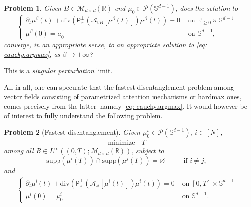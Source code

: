\documentclass[a4paper,11pt]{article}
\theoremstyle{plain}
\newtheorem{problem}{Problem}
\newcommand{\supp}{\mathrm{supp}}
\newcommand{\R}{\mathbb{R}}
\newcommand{\proj}{\bm{\mathsf{P}}^\perp}
\newcommand{\dive}{\mathrm{div}}
\renewcommand{\S}{\mathbb{S}^{d-1}}
\newcommand{\bB}{\bm{\mathit{B}}}
\renewcommand{\geq}{\geqslant}
\numberwithin{equation}{section}
\begin{document}
\begin{problem}
Given $\bB\in\mathscr{M}_{d\times d}(\R)$ and $\mu_0\in\mathscr{P}(\S)$, does the solution to
\begin{equation*}
\begin{cases}
\partial_t \mu^\beta(t)+\dive\left(\proj_x\left(\mathscr{A}_{\beta \bB}\left[\mu^\beta(t)\right]\right)\mu^\beta(t)\right)=0 &\text{ on } \mathbb{R}_{\geq0}\times\S\\
\mu^\beta(0)=\mu_0 &\text{ on } \S,
\end{cases}
\end{equation*}
converge, in an appropriate sense, to an appropriate solution to \eqref{eq: cauchy.argmax}, as $\beta\to+\infty$? 
\end{problem}

This is a \emph{singular perturbation} limit. 

All in all, one can speculate that the fastest disentanglement problem among vector fields consisting of parametrized attention mechanisms or hardmax ones, comes precisely from the latter, namely \eqref{eq: cauchy.argmax}. 
It would however be of interest to fully understand the following problem.

\begin{problem}[Fastest disentanglement]
Given $\mu_0^i\in\mathscr{P}(\S)$, $i\in[N]$,
\begin{align*}
    \mathrm{minimize }\quad T
\end{align*}
among all $\bB\in L^\infty((0,T);\mathscr{M}_{d\times d}(\mathbb{R}))$, subject to
\begin{equation*}
\supp(\mu^i(T))\cap\supp(\mu^j(T))=\varnothing \hspace{1cm}\text{ if } i\neq j,    
\end{equation*}
and
\begin{align*}
\begin{cases}
    \partial_t \mu^i(t)+\dive\left(\proj_x\left(\mathscr{A}_{\bB}[\mu^i(t)]\right)\mu^i(t)\right)=0 &\text{ on } [0,T]\times\S\\
\mu^i(0)=\mu_0^i &\text{ on } \S.
\end{cases}
\end{align*}
\end{problem}
\end{document}

